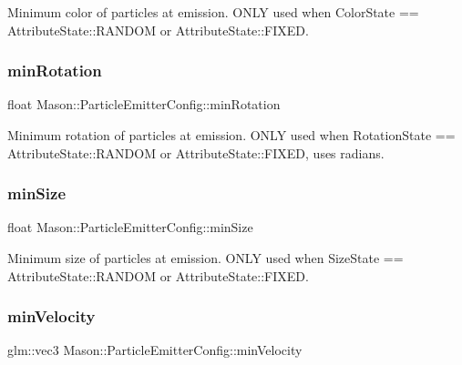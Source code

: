 Minimum color of particles at emission. O\+N\+LY used when Color\+State == Attribute\+State\+::\+R\+A\+N\+D\+OM or Attribute\+State\+::\+F\+I\+X\+ED. 

\hypertarget{struct_mason_1_1_particle_emitter_config_ae6755b96da7af8b4c469b64f0887e186}{}\label{struct_mason_1_1_particle_emitter_config_ae6755b96da7af8b4c469b64f0887e186} 
\subsubsection{\texorpdfstring{min\+Rotation}{minRotation}}
{\footnotesize\ttfamily float Mason\+::\+Particle\+Emitter\+Config\+::min\+Rotation}



Minimum rotation of particles at emission. O\+N\+LY used when Rotation\+State == Attribute\+State\+::\+R\+A\+N\+D\+OM or Attribute\+State\+::\+F\+I\+X\+ED, uses radians. 

\hypertarget{struct_mason_1_1_particle_emitter_config_ab46ccc780e60c6b7006749058654455f}{}\label{struct_mason_1_1_particle_emitter_config_ab46ccc780e60c6b7006749058654455f} 
\subsubsection{\texorpdfstring{min\+Size}{minSize}}
{\footnotesize\ttfamily float Mason\+::\+Particle\+Emitter\+Config\+::min\+Size}



Minimum size of particles at emission. O\+N\+LY used when Size\+State == Attribute\+State\+::\+R\+A\+N\+D\+OM or Attribute\+State\+::\+F\+I\+X\+ED. 

\hypertarget{struct_mason_1_1_particle_emitter_config_a3d8df085c0a91b61f42adc5eef888c79}{}\label{struct_mason_1_1_particle_emitter_config_a3d8df085c0a91b61f42adc5eef888c79} 
\subsubsection{\texorpdfstring{min\+Velocity}{minVelocity}}
{\footnotesize\ttfamily glm\+::vec3 Mason\+::\+Particle\+Emitter\+Config\+::min\+Velocity}




